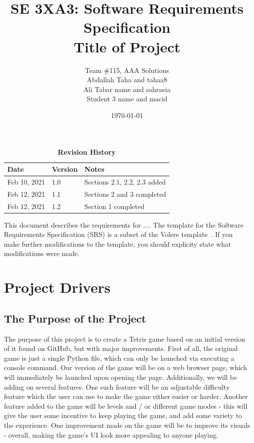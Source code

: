 \documentclass[12pt, titlepage]{article}
\title{SE 3XA3: Software Requirements Specification\\Title of Project}
\author{Team \#115, AAA Solutions
		\\ Abdallah Taha and tahaa8
		\\ Ali Tabar name and sahraeia
		\\ Student 3 name and macid
}
\date{\today}
\begin{document}
\maketitle

\tableofcontents
\listoftables
\listoffigures

\begin{table}[bp]
\caption{\bf Revision History}
\begin{tabularx}{\textwidth}{p{3cm}p{2cm}X}
\toprule {\bf Date} & {\bf Version} & {\bf Notes}\\
\midrule
Feb 10, 2021 & 1.0 & Sections 2.1, 2.2, 2.3 added\\
Feb 12, 2021 & 1.1 & Sections 2 and 3 completed\\
Feb 12, 2021 & 1.2 & Section 1 completed\\
\bottomrule
\end{tabularx}
\end{table}

\newpage


This document describes the requirements for ....  The template for the Software
Requirements Specification (SRS) is a subset of the Volere
template~\citep{RobertsonAndRobertson2012}.  If you make further modifications
to the template, you should explicity state what modifications were made.

\section{Project Drivers}

\subsection{The Purpose of the Project}
The purpose of this project is to create a Tetris game based on an initial version of it found on GitHub, but with major improvements. First of all, the original game is just a single Python file, which can only be launched via executing a console command. Our version of the game will be on a web browser page, which will immediately be launched upon opening the page. Additionally, we will be adding on several features. One such feature will be an adjustable difficulty feature which the user can use to make the game either easier or harder. Another feature added to the game will be levels and / or different game modes - this will give the user some incentive to keep playing the game, and add some variety to the experience. 
One improvement made on the game will be to improve its visuals - overall, making the game’s UI look more appealing to anyone playing.
\end{document}

